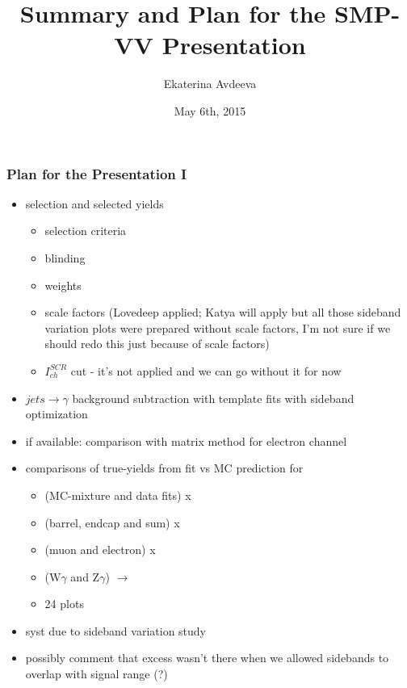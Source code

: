 \documentclass{beamer}
\title{Summary and Plan for the SMP-VV Presentation}
\author{Ekaterina Avdeeva}
\institute{University of Nebraska - Lincoln}
\date{May 6th, 2015}
\begin{document}
\begin{frame}
\titlepage
\end{frame}

\begin{frame}\frametitle{Plan for the Presentation I} 
    \scriptsize
    \begin{itemize}
      \item selection and selected yields
      \begin{itemize} 
    \scriptsize
         \item selection criteria
         \item blinding 
         \item weights
         \item scale factors (\tiny{Lovedeep applied; Katya will apply but all those sideband variation plots were prepared without scale factors, I'm not sure if we should redo this just because of scale factors})
         \item $I_{ch}^{SCR}$ cut - it's not applied and we can go without it for now
      \end{itemize} 
      \item $jets \rightarrow \gamma$ background subtraction with template fits with sideband optimization
      \item if available: comparison with matrix method for electron channel
      \item comparisons of true-yields from fit vs MC prediction for
      \begin{itemize}
    \scriptsize
         \item (MC-mixture and data fits) x
         \item (barrel, endcap and sum) x
         \item (muon and electron) x
         \item (W$\gamma$ and Z$\gamma$) $\rightarrow$
         \item 24 plots
      \end{itemize}
    \scriptsize
      \item syst due to sideband variation study
      \item possibly comment that excess wasn't there when we allowed sidebands to overlap with signal range (?)
    \end{itemize}
\end{frame}
\end{document}
